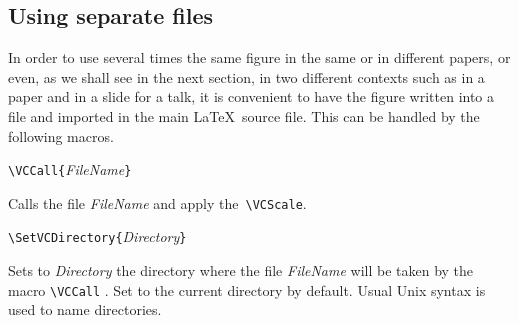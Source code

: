 \documentclass[11pt,twoside]{article}
\newlength{\ColoText}%
\newlength{\ColoFigu}%
\newlength{\parindenttemp} %
\newcommand{\noi}{\noindent}
\newlength{\jsIndent}%
\begin{document}
\subsection{Using separate files}\label{subsec.fil}

In order to use several times the same figure in the same or in 
different papers, or even, as we shall see in the next section, in two 
different contexts such as in a paper and in a slide for a talk,
it is convenient to have the figure written into a file and imported
in the main \LaTeX \ source file.
This can be handled by the following macros.

\noi 
\hspace*{-\jsIndent}
\begin{minipage}[t]{\ColoText}
        \par\vspace*{0mm}%
        \footnotesize
\verb+\VCCall{+\textsl{FileName}\verb+}+
\normalsize
\end{minipage}%
\hspace*{1.2em}%
\begin{minipage}[t]{\ColoFigu}%
\par\vspace*{0mm}%
Calls the file \textsl{FileName} and apply the~\verb+\VCScale+.
\end{minipage}%

\noi 
\hspace*{-\jsIndent}
\begin{minipage}[t]{\ColoText}
        \par\vspace*{0mm}%
        \footnotesize
\verb+\SetVCDirectory{+\textsl{Directory}\verb+}+
\normalsize
\end{minipage}%
\hspace*{1.2em}%
\begin{minipage}[t]{\ColoFigu}%
\par\vspace*{0mm}%
Sets to \textsl{Directory} the directory where the file 
\textsl{FileName} will be taken by the macro \verb+\VCCall+ .
Set to the current directory by default.
Usual Unix syntax is used to name directories.
\end{minipage}%
\end{document}
